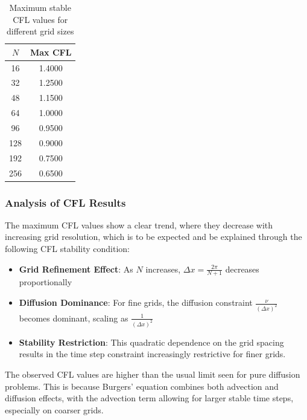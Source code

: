 \begin{table}[H]
	\centering
	\begin{tabular}{|c|c|}
		\hline
		$N$ & Max CFL \\
		\hline
		16  & 1.4000  \\
		32  & 1.2500  \\
		48  & 1.1500  \\
		64  & 1.0000  \\
		96  & 0.9500  \\
		128 & 0.9000  \\
		192 & 0.7500  \\
		256 & 0.6500  \\
		\hline
	\end{tabular}
	\caption{Maximum stable CFL values for different grid sizes}
	\label{tab:cfl}
\end{table}

\subsubsection{Analysis of CFL Results}
The maximum CFL values show a clear trend, where they decrease with increasing grid resolution, which is to be expected and be explained through the following CFL stability condition:
%
\begin{itemize}
	\item \textbf{Grid Refinement Effect}: As $N$ increases, $\Delta x = \frac{2\pi}{N+1}$ decreases proportionally
	\item \textbf{Diffusion Dominance}: For fine grids, the diffusion constraint $\frac{\nu}{(\Delta x)^2}$ becomes dominant, scaling as $\frac{1}{(\Delta x)^2}$
	\item \textbf{Stability Restriction}: This quadratic dependence on the grid spacing results in the time step constraint increasingly restrictive for finer grids.
\end{itemize}
%
The observed CFL values are higher than the usual limit seen for pure diffusion problems. This is because Burgers' equation combines both advection and diffusion effects, with the advection term allowing for larger stable time steps, especially on coarser grids.

